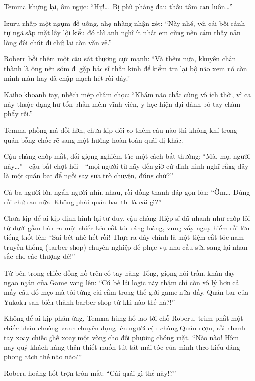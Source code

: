 \documentclass[../main.tex]{subfiles}
\begin{document}
Temma khựng lại, ôm ngực: ``Hự!\dots\ Bị phũ phàng đau thấu tâm can luôn\dots''

Izuru nhấp một ngụm đồ uống, nhẹ nhàng nhận xét: ``Này nhé, với cái bối cảnh tự ngã sấp mặt lầy lội kiểu đó thì anh nghĩ ít nhất em cũng nên cảm thấy nản lòng đôi chút đi chứ lại còn văn vẻ.''

Roberu bồi thêm một câu sát thương cực mạnh: ``Và thêm nữa, khuyên chân thành là ông nên sớm đi gặp bác sĩ thần kinh để kiểm tra lại bộ não xem nó còn minh mẫn hay đã chập mạch hết rồi đấy.''

Kaiho khoanh tay, nhếch mép châm chọc: ``Khám não chắc cũng vô ích thôi, vì ca này thuộc dạng hư tổn phần mềm vĩnh viễn, y học hiện đại đành bó tay chấm phẩy rồi.''

Temma phồng má dỗi hờn, chưa kịp đôi co thêm câu nào thì không khí trong quán bỗng chốc rẽ sang một hướng hoàn toàn quái dị khác.

Cậu chàng chớp mắt, đổi giọng nghiêm túc một cách bất thường: ``Mà, mọi người này\dots'' - cậu bất chợt hỏi - ``mọi người từ nãy đến giờ cứ đinh ninh nghĩ rằng đây là một quán bar để ngồi say sưa trò chuyện, đúng chứ?''

Cả ba người lớn ngẩn người nhìn nhau, rồi đồng thanh đáp gọn lỏn: ``Ờm\dots\ Đúng rồi chứ sao nữa. Không phải quán bar thì là cái gì?''

Chưa kịp để ai kịp định hình lại tư duy, cậu chàng Hiệp sĩ đã nhanh như chớp lôi từ dưới gầm bàn ra một chiếc kéo cắt tóc sáng loáng, vung vẩy nguy hiểm rồi lớn tiếng thốt lên: ``Sai bét nhè hết rồi! Thực ra đây chính là một tiệm cắt tóc nam truyền thống (barber shop) chuyên nghiệp để phục vụ nhu cầu sửa sang lại nhan sắc cho các thượng đế!''

Từ bên trong chiếc đồng hồ trên cổ tay nàng Tổng, giọng nói trầm khàn đầy ngao ngán của Game vang lên: ``Cú bẻ lái logic này thậm chí còn vô lý hơn cả mấy câu đố mẹo mà tôi từng cài cắm trong thế giới game nữa đấy. Quán bar của Yukoku-san biến thành barber shop từ khi nào thế hả?!''


Không để ai kịp phản ứng, Temma hùng hổ lao tới chỗ Roberu, trùm phắt một chiếc khăn choàng xanh chuyên dụng lên người cậu chàng Quán rượu, rồi nhanh tay xoay chiếc ghế xoay một vòng cho đối phương chóng mặt. ``Nào nào! Hôm nay quý khách hàng thân thiết muốn tút tát mái tóc của mình theo kiểu dáng phong cách thế nào nào?''

Roberu hoảng hốt trợn tròn mắt: ``Cái quái gì thế này!?''
\end{document}
